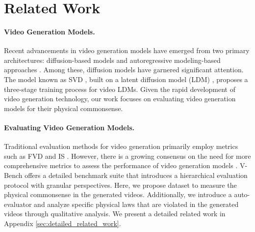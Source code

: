 \section{Related Work}
\label{sec:related_work}


\paragraph{Video Generation Models.}
Recent advancements in video generation models have emerged from two primary architectures: diffusion-based models \cite{gen2, svd, liu2024sora, blattmann2023align, wang2023lavie, wang2023modelscope, chen2024videocrafter2, khachatryan2023text2video} and autoregressive modeling-based approaches \cite{magvit2, kondratyuk2023videopoet, hong2022cogvideo, villegas2022phenaki}. Among these, diffusion models have garnered significant attention. The model known as SVD \cite{svd}, built on a latent diffusion model (LDM) \cite{ldm}, proposes a three-stage training process for video LDMs. Given the rapid development of video generation technology, our work focuses on evaluating video generation models for their physical commonsense.

\paragraph{Evaluating Video Generation Models.} Traditional evaluation methods for video generation primarily employ metrics such as FVD \cite{unterthiner2018towards} and IS \cite{salimans2016improved}. However, there is a growing consensus on the need for more comprehensive metrics to assess the performance of video generation models \cite{huang2023vbench, liu2023evalcrafter, subjectbench, lin2024evaluating}. V-Bench \cite{huang2023vbench} offers a detailed benchmark suite that introduces a hierarchical evaluation protocol with granular perspectives. Here, we propose \name{} dataset to measure the physical commonsense in the generated videos. Additionally, we introduce a \model{} auto-evaluator and analyze specific physical laws \cite{bisk2020piqa} that are violated in the generated videos through qualitative analysis. We present a detailed related work in Appendix \ref{sec:detailed_related_work}.